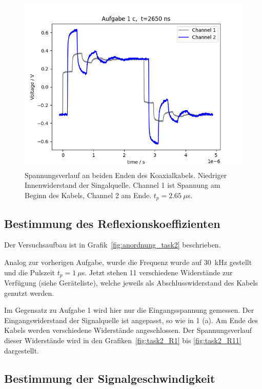 \documentclass{article}
\begin{document}
\begin{figure}[H]
\centering
\caption{Spannungsverlauf an beiden Enden des Koaxialkabels. Niedriger Innenwiderstand der Singalquelle. Channel 1 ist Spannung am Beginn des Kabels, Channel 2 am Ende. $t_p = 2.65~\mu$s.}
\label{fig:task1b_2650ns}
\includegraphics[scale=0.6]{bilder/task1c/task1c_2650ns.png}
\end{figure}



\subsection{Bestimmung des Reflexionskoeffizienten}

Der Versuchsaufbau ist in Grafik~\ref{fig:anordnung_task2} beschrieben.

Analog zur vorherigen Aufgabe, wurde die Frequenz wurde auf 30~kHz gestellt und die Pulszeit $t_p = 1~\mu$s. Jetzt stehen 11 verschiedene Widerstände zur Verfügung (siehe Geräteliste), welche jeweils als Abschlusswiderstand des Kabels genutzt werden.

Im Gegensatz zu Aufgabe 1 wird hier nur die Eingangsspannung gemessen. Der Eingangswiderstand der Signalquelle ist angepasst, so wie in 1 (a). Am Ende des Kabels werden verschiedene Widerstände angeschlossen. Der Spannungsverlauf dieser Widerstände wird in den Grafiken~\ref{fig:task2_R1} bis \ref{fig:task2_R11} dargestellt.





\subsection{Bestimmung der Signalgeschwindigkeit}
\end{document}
